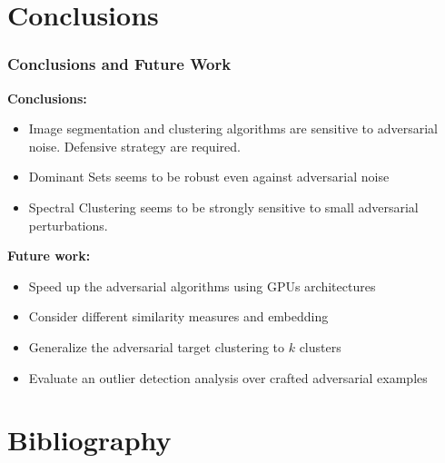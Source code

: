 \documentclass{beamer}
\begin{document}
\section{Conclusions}

\begin{frame}
  \frametitle{Conclusions and Future Work}
  	\changefontsizes{8.5pt}
\textbf{Conclusions:}
  \begin{itemize}
  	\item Image segmentation and clustering algorithms are sensitive to adversarial noise. Defensive strategy are required.
    \item Dominant Sets seems to be robust even against adversarial noise
    \item Spectral Clustering seems to be strongly sensitive to small adversarial perturbations.\\
  \end{itemize}
\vspace{0.7cm}
\textbf{Future work:}
	\begin{itemize}
		\item Speed up the adversarial algorithms using GPUs architectures
		\item Consider different similarity measures and embedding
		\item Generalize the adversarial target clustering to $k$ clusters
		\item Evaluate an outlier detection analysis over crafted adversarial examples
	\end{itemize}
\end{frame}



\section{Bibliography}
\end{document}
